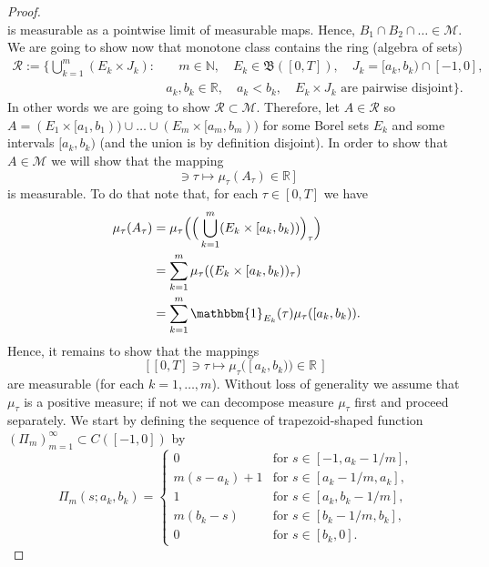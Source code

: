 \documentclass[reqno]{amsart}
\theoremstyle{plain}
\numberwithin{equation}{section}
\numberwithin{definition}{section}
\newcommand\RR{\ensuremath{\mathbb{R}}}
\begin{document}
\begin{proof}
\begin{equation*}
   \end{equation*}
   is measurable as a pointwise limit of measurable maps. Hence, $B_1\cap B_2\cap\dots \in \mathcal{M}$. We are going to show now that monotone class contains the ring (algebra of sets) 
\begin{equation*}
\begin{split}
    \mathcal R :=
    \Big\{
        \bigcup_{k=1}^{m}(E_k\times J_k): &      
            \quad m\in\mathbb N,\quad E_k\in\mathfrak B([0,T]), \quad J_k=[a_k,b_k)\cap[-1,0], \\ & 
            a_k,b_k\in\mathbb R,\quad a_k<b_k,\quad E_k\times J_k\text{ are pairwise disjoint}\Big\}. 
\end{split}
\end{equation*}
   In other words we are going to show $\mathcal{R}\subset \mathcal{M}$. Therefore, let $A\in \mathcal{R}$ so $A=(E_1\times [a_1,b_1))\cup\dots\cup (E_m\times [a_m,b_m))$ for some Borel sets $E_k$ and some intervals $[a_k,b_k)$ (and the union is by definition disjoint). In order to show that $A\in \mathcal{M}$ we will show that the mapping 
   \begin{equation*}
       [\,[0,T]\ni\tau\mapsto \mu_{\tau}(A_{\tau})\in \RR\,]
   \end{equation*}
   is measurable. To do that note that, for each $\tau\in [0,T]$ we have 
   \begin{align*}
       \mu_{\tau}(A_{\tau}) & = \mu_{\tau}\Big(\Big( \bigcup_{k=1}^m (E_k\times [a_k,b_k))\Big)_{\tau}\Big) \\
       &= \sum_{k=1}^m \mu_{\tau}( (E_k\times [a_k,b_k))_{\tau} ) \\
          &= \sum_{k=1}^m \mathbbm{1}_{E_k}(\tau) \mu_{\tau}([a_k,b_k)). 
   \end{align*}
Hence, it remains to show that the mappings 
\begin{equation} \label{eq:ring-map}
    [\, [0,T]\ni \tau \mapsto  \mu_{\tau}([a_k,b_k)) \in \RR \, ]
\end{equation}
are measurable (for each $k=1,\dots,m$). Without loss of generality we assume that $\mu_{\tau}$ is a positive measure; if not we can decompose measure $\mu_{\tau}$ first and proceed separately. We start by defining the sequence of trapezoid-shaped function $(\Pi_m)_{m=1}^{\infty}\subset C([-1,0])$ by 
\begin{equation*}
    \Pi_m(s; a_k, b_k) = \begin{cases}  0 & \text{for } s \in [-1, a_k - 1/m], \\  m(s - a_k) + 1 & \text{for } s \in [a_k - 1/m, a_k], \\  1 & \text{for } s \in [a_k, b_k - 1/m], \\  m(b_k - s) & \text{for } s \in [b_k - 1/m, b_k], \\  0 & \text{for } s \in [b_k, 0].  \end{cases}

\end{equation*}
\end{proof}
\end{document}
